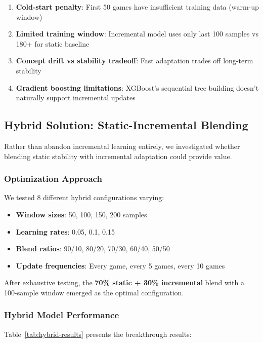 \begin{enumerate}
\item \textbf{Cold-start penalty}: First 50 games have insufficient training data (warm-up window)
\item \textbf{Limited training window}: Incremental model uses only last 100 samples vs 180+ for static baseline
\item \textbf{Concept drift vs stability tradeoff}: Fast adaptation trades off long-term stability
\item \textbf{Gradient boosting limitations}: XGBoost's sequential tree building doesn't naturally support incremental updates
\end{enumerate}

\subsection{Hybrid Solution: Static-Incremental Blending}

Rather than abandon incremental learning entirely, we investigated whether blending static stability with incremental adaptation could provide value.

\subsubsection{Optimization Approach}

We tested 8 different hybrid configurations varying:
\begin{itemize}
\item \textbf{Window sizes}: 50, 100, 150, 200 samples
\item \textbf{Learning rates}: 0.05, 0.1, 0.15
\item \textbf{Blend ratios}: 90/10, 80/20, 70/30, 60/40, 50/50
\item \textbf{Update frequencies}: Every game, every 5 games, every 10 games
\end{itemize}

\noindent After exhaustive testing, the \textbf{70\% static + 30\% incremental} blend with a 100-sample window emerged as the optimal configuration.

\subsubsection{Hybrid Model Performance}

Table~\ref{tab:hybrid-results} presents the breakthrough results:

